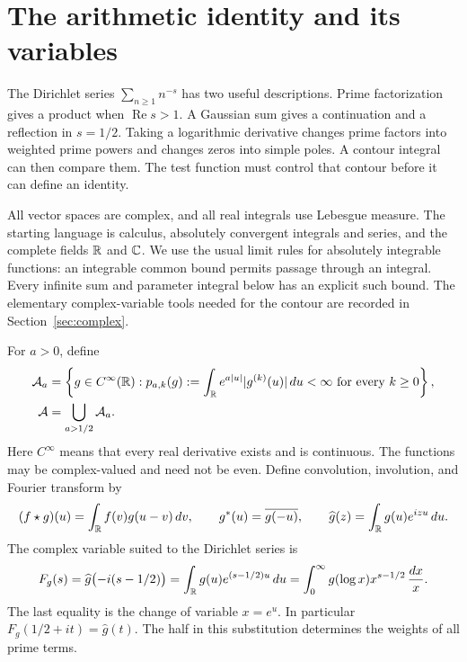 \section{The arithmetic identity and its variables}

The Dirichlet series $\sum_{n\geq1}n^{-s}$ has two useful descriptions.
Prime factorization gives a product when $\operatorname{Re}s>1$.
A Gaussian sum gives a continuation and a reflection in $s=1/2$.
Taking a logarithmic derivative changes prime factors into weighted prime
powers and changes zeros into simple poles.  A contour integral can then
compare them.  The test function must control that contour before it can
define an identity.

All vector spaces are complex, and all real integrals use Lebesgue measure.
The starting language is calculus, absolutely convergent integrals and
series, and the complete fields $\mathbb R$ and $\mathbb C$.
We use the usual limit rules for absolutely integrable functions: an
integrable common bound permits passage through an integral.
Every infinite sum and parameter integral below has an explicit such bound.
The elementary complex-variable tools needed for the contour are recorded
in Section~\ref{sec:complex}.

For $a>0$, define
\begin{equation}
 \begin{aligned}
 \mathcal A_a&=\left\{g\in C^\infty(\mathbb R):
   p_{a,k}(g):=\int_{\mathbb R}e^{a|u|}|g^{(k)}(u)|\,du<\infty
                     \text{ for every }k\geq0\right\},\\
 \mathcal A&=\bigcup_{a>1/2}\mathcal A_a.
 \end{aligned}
 \label{eq:test-class}
\end{equation}
Here $C^\infty$ means that every real derivative exists and is continuous.
The functions may be complex-valued and need not be even.
Define convolution, involution, and Fourier transform by
\begin{equation}
 (f\star g)(u)=\int_{\mathbb R}f(v)g(u-v)\,dv,
 \qquad g^*(u)=\overline{g(-u)},
 \qquad \widehat g(z)=\int_{\mathbb R}g(u)e^{izu}\,du.
 \label{eq:operations}
\end{equation}
The complex variable suited to the Dirichlet series is
\begin{equation}
 F_g(s)=\widehat g\bigl(-i(s-1/2)\bigr)
       =\int_{\mathbb R}g(u)e^{(s-1/2)u}\,du
       =\int_0^\infty g(\log x)x^{s-1/2}\,\frac{dx}{x}.
 \label{eq:centered-mellin}
\end{equation}
The last equality is the change of variable $x=e^u$.
In particular $F_g(1/2+it)=\widehat g(t)$.
The half in this substitution determines the weights of all prime terms.

